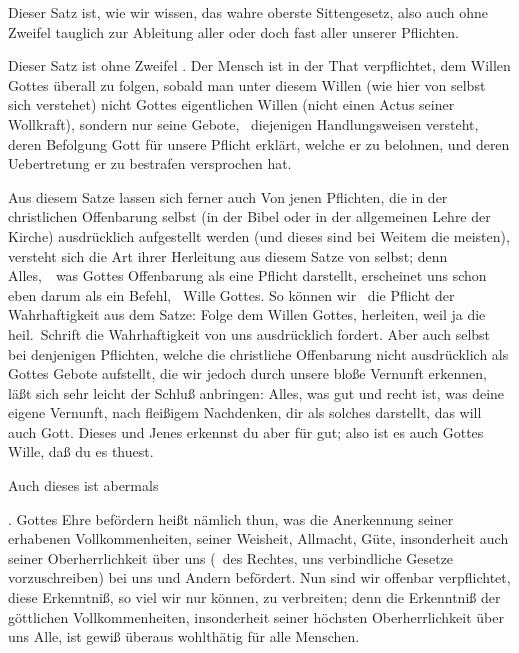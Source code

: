 \begin{aufza}
\item {}\par
Dieser Satz ist, wie wir wissen, das wahre oberste Sittengesetz, also auch ohne Zweifel tauglich zur Ableitung aller oder doch fast aller unserer Pflichten.
\item {}\par
\begin{aufzb}
\item Dieser Satz ist ohne Zweifel . Der Mensch ist in der That verpflichtet, dem Willen Gottes überall zu folgen, sobald man unter diesem Willen (wie hier von selbst sich verstehet) nicht Gottes eigentlichen Willen (nicht einen Actus seiner Wollkraft), sondern nur seine Gebote, \dh\  diejenigen Handlungsweisen versteht, deren Befolgung Gott für unsere Pflicht erklärt, welche er zu belohnen, und deren Uebertretung er zu bestrafen versprochen hat.
\item Aus diesem Satze lassen sich ferner auch  Von jenen Pflichten, die in der christlichen Offenbarung selbst (in der Bibel oder in der allgemeinen Lehre der Kirche) ausdrücklich aufgestellt werden (und dieses sind bei Weitem die meisten), versteht sich die Art ihrer Herleitung aus diesem Satze von selbst; denn Alles,~\ was Gottes Offenbarung als eine Pflicht darstellt, erscheinet uns schon eben darum als ein Befehl, \dh\  Wille Gottes. So können wir \zB\  die Pflicht der Wahrhaftigkeit aus dem Satze: Folge dem Willen Gottes, herleiten, weil ja die heil.\ Schrift die Wahrhaftigkeit von uns ausdrücklich fordert. Aber auch selbst bei denjenigen Pflichten, welche die christliche Offenbarung nicht ausdrücklich als Gottes Gebote aufstellt, die wir jedoch durch unsere bloße Vernunft erkennen, läßt sich sehr leicht der Schluß anbringen: Alles, was gut und recht ist, was deine eigene Vernunft, nach fleißigem Nachdenken, dir als solches darstellt, das will auch Gott. Dieses und Jenes erkennst du aber für gut; also ist es auch Gottes Wille, daß du es thuest.
\end{aufzb}
\item {}\par
Auch dieses ist abermals
\begin{aufzb}
\item {}. Gottes Ehre befördern heißt nämlich thun, was die Anerkennung seiner erhabenen Vollkommenheiten, seiner Weisheit, Allmacht, Güte, insonderheit auch seiner Oberherrlichkeit über uns (\di\ des Rechtes, uns verbindliche Gesetze vorzuschreiben) bei uns und Andern befördert. Nun sind wir offenbar verpflichtet, diese Erkenntniß, so viel wir nur können, zu verbreiten; denn die Erkenntniß der göttlichen Vollkommenheiten, insonderheit seiner höchsten Oberherrlichkeit über uns Alle, ist gewiß überaus wohlthätig für alle Menschen.

\end{aufzb}
\end{aufza}
